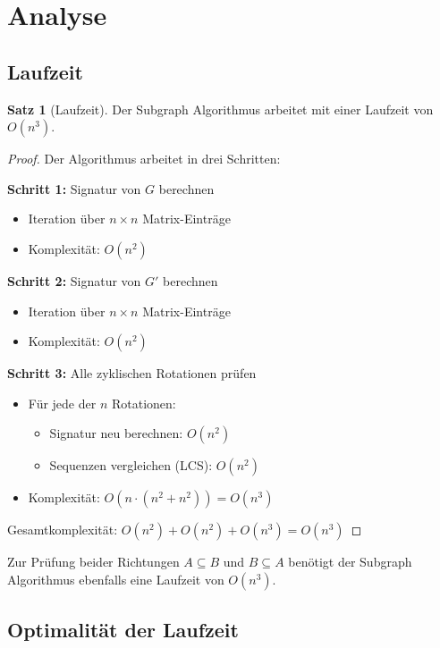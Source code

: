 \documentclass[a4paper,12pt]{article}
\theoremstyle{definition}
\newtheorem{satz}{Satz}
\begin{document}
\section{Analyse}

\subsection{Laufzeit}

\begin{satz}[Laufzeit]
	Der Subgraph Algorithmus arbeitet mit einer Laufzeit von $O(n^3)$.
\end{satz}

\begin{proof}
	Der Algorithmus arbeitet in drei Schritten:
	
	\textbf{Schritt 1:} Signatur von $G$ berechnen
	\begin{itemize}
		\item Iteration über $n \times n$ Matrix-Einträge
		\item Komplexität: $O(n^2)$
	\end{itemize}
	
	\textbf{Schritt 2:} Signatur von $G'$ berechnen
	\begin{itemize}
		\item Iteration über $n \times n$ Matrix-Einträge
		\item Komplexität: $O(n^2)$
	\end{itemize}
	
	\textbf{Schritt 3:} Alle zyklischen Rotationen prüfen
	\begin{itemize}
		\item Für jede der $n$ Rotationen:
		\begin{itemize}
			\item Signatur neu berechnen: $O(n^2)$
			\item Sequenzen vergleichen (LCS): $O(n^2)$
		\end{itemize}
		\item Komplexität: $O(n \cdot (n^2 + n^2)) = O(n^3)$
	\end{itemize}
	
	Gesamtkomplexität: $O(n^2) + O(n^2) + O(n^3) = O(n^3)$
\end{proof}

Zur Prüfung beider Richtungen $A \subseteq B$ und $B \subseteq A$ benötigt der Subgraph Algorithmus ebenfalls eine Laufzeit von $O(n^3)$.

\subsection{Optimalität der Laufzeit}
\end{document}
